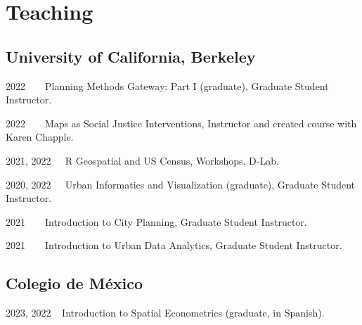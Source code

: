 \documentclass[12pt,letterpaper]{report}
\begin{document}
    \section*{Teaching}
    \subsection*{University of California, Berkeley}
    \begin{tablist}
        \item[2022] \tab{}$\>$ $\>$ $\>$ Planning Methods Gateway: Part I (graduate), Graduate Student Instructor.
        \item[2022] \tab{}$\>$ $\>$ $\>$ Maps as Social Justice Interventions, Instructor and created course with Karen Chapple.
        \item[2021, 2022] $\>$ $\>$  R Geospatial and US Census, Workshops. D‐Lab.
        \item[2020, 2022] $\>$ $\>$  Urban Informatics and Visualization (graduate), Graduate Student Instructor.
        \item[2021] \tab{} $\>$ $\>$ $\>$  Introduction to City Planning, Graduate Student Instructor.
        \item[2021] \tab{} $\>$ $\>$ $\>$  Introduction to Urban Data Analytics, Graduate Student Instructor.
    \end{tablist}
    
    \subsection*{Colegio de México}
        \begin{tablist}
        \item[2023, 2022] $\>$ $\>$Introduction to Spatial Econometrics (graduate, in Spanish).
    \end{tablist}

    


\end{document}
